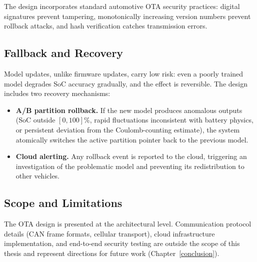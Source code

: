 The design incorporates standard automotive OTA security practices: digital signatures prevent tampering, monotonically increasing version numbers prevent rollback attacks, and hash verification catches transmission errors.

\subsection{Fallback and Recovery}

Model updates, unlike firmware updates, carry low risk: even a poorly trained model degrades SoC accuracy gradually, and the effect is reversible. The design includes two recovery mechanisms:

\begin{itemize}
    \item \textbf{A/B partition rollback.} If the new model produces anomalous outputs (SoC outside $[0, 100]\%$, rapid fluctuations inconsistent with battery physics, or persistent deviation from the Coulomb-counting estimate), the system atomically switches the active partition pointer back to the previous model.
    \item \textbf{Cloud alerting.} Any rollback event is reported to the cloud, triggering an investigation of the problematic model and preventing its redistribution to other vehicles.
\end{itemize}

\subsection{Scope and Limitations}

The OTA design is presented at the architectural level. Communication protocol details (CAN frame formats, cellular transport), cloud infrastructure implementation, and end-to-end security testing are outside the scope of this thesis and represent directions for future work (Chapter~\ref{conclusion}).
